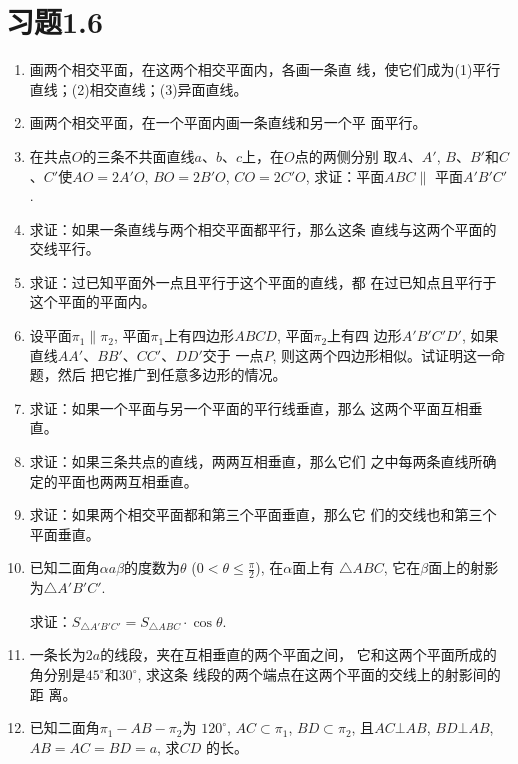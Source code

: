 \section*{习题1.6}
\begin{enumerate}
  \item 画两个相交平面，在这两个相交平面内，各画一条直
  线，使它们成为(1)平行直线；(2)相交直线；(3)异面直线。
  \item 画两个相交平面，在一个平面内画一条直线和另一个平
  面平行。
  \item 在共点$O$的三条不共面直线$a$、$b$、$c$上，在$O$点的两侧分别
  取$A$、$A'$, $B$、$B'$和$C$、$C'$使$AO=2A'O$, $BO=2B'O$, 
  $CO=2C'O$, 求证：平面$ABC\parallel$ 平面$A'B'C'$.
  \item 求证：如果一条直线与两个相交平面都平行，那么这条
  直线与这两个平面的交线平行。
  \item 求证：过已知平面外一点且平行于这个平面的直线，都
  在过已知点且平行于这个平面的平面内。
  \item 设平面$\pi_1\parallel \pi_2$, 平面$\pi_1$上有四边形$ABCD$, 平面$\pi_2$上有四
  边形$A'B'C'D'$, 如果直线$AA'$、$BB'$、$CC'$、$DD'$交于
  一点$P$, 则这两个四边形相似。试证明这一命题，然后
  把它推广到任意多边形的情况。
  \item 求证：如果一个平面与另一个平面的平行线垂直，那么
  这两个平面互相垂直。
  \item 求证：如果三条共点的直线，两两互相垂直，那么它们
  之中每两条直线所确定的平面也两两互相垂直。
  \item 求证：如果两个相交平面都和第三个平面垂直，那么它
  们的交线也和第三个平面垂直。
  \item 已知二面角$\alpha a\beta$的度数为$\theta$ ($0<\theta\le \frac{\pi}{2}$), 
  在$\alpha$面上有
  $\triangle ABC$, 它在$\beta$面上的射影为$\triangle A'B'C'$. 

  求证：$S_{\triangle A'B'C'}=S_{\triangle ABC}\cdot \cos\theta$.
  \item 一条长为$2a$的线段，夹在互相垂直的两个平面之间，
  它和这两个平面所成的角分别是$45^{\circ}$和$30^{\circ}$, 求这条
  线段的两个端点在这两个平面的交线上的射影间的距
  离。
\item 已知二面角$\pi_1-AB-\pi_2$为
$120^{\circ}$, $AC\subset \pi_1$, $BD\subset \pi_2$, 
且$AC\bot AB$, $BD\bot AB$, 
$AB=AC=BD=a$, 求$CD$
的长。

\begin{figure}[htp]
  \centering
{}
\end{figure}
\end{enumerate}
